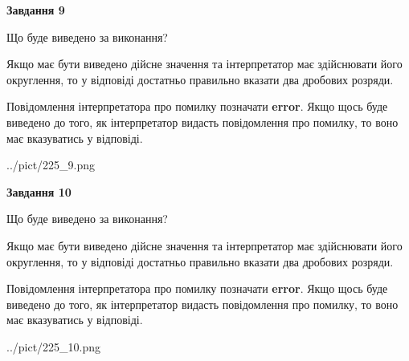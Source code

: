 \documentclass[12pt, ukrainian]{article}
\begin{document}
{\begin {Large}
{\begin {center}\textbf{Завдання 9}\end {center}}\par
Що буде виведено за виконання? \par

Якщо має бути виведено дійсне значення та інтерпретатор має здійснювати його округлення, 
то у відповіді достатньо правильно вказати два дробових розряди.

Повідомлення інтерпретатора про помилку позначати \textbf{error}.
Якщо щось буде виведено до того, як інтерпретатор видасть повідомлення про помилку, 
то воно має вказуватись у відповіді. \par

\begin{center}
	{../pict/225_9.png}
\end{center}
\newpage

{\begin {center}\textbf{Завдання 10}\end {center}}\par
Що буде виведено за виконання? \par

Якщо має бути виведено дійсне значення та інтерпретатор має здійснювати його округлення, 
то у відповіді достатньо правильно вказати два дробових розряди.

Повідомлення інтерпретатора про помилку позначати \textbf{error}.
Якщо щось буде виведено до того, як інтерпретатор видасть повідомлення про помилку, 
то воно має вказуватись у відповіді. \par

\begin{center}
	{../pict/225_10.png}
\end{center}
\newpage

\end {Large}}
\end{document}

